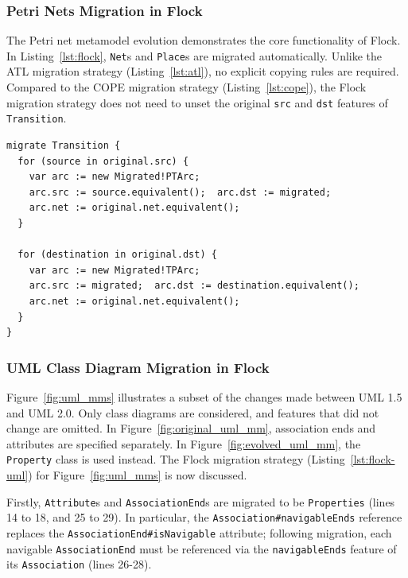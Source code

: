 \subsubsection{Petri Nets Migration in Flock}
The Petri net metamodel evolution demonstrates the core functionality of Flock. In Listing~\ref{lst:flock}, \texttt{Net}s and \texttt{Place}s are migrated automatically. Unlike the ATL migration strategy (Listing~\ref{lst:atl}), no explicit copying rules are required. Compared to the COPE migration strategy (Listing~\ref{lst:cope}), the Flock migration strategy does not need to unset the original \texttt{src} and \texttt{dst} features of \texttt{Transition}.

\begin{lstlisting}[caption=Petri nets model migration in Flock, label=lst:flock, language=Flock]
migrate Transition {
  for (source in original.src) {
    var arc := new Migrated!PTArc;
    arc.src := source.equivalent();  arc.dst := migrated;
    arc.net := original.net.equivalent();
  }

  for (destination in original.dst) {
    var arc := new Migrated!TPArc;
    arc.src := migrated;  arc.dst := destination.equivalent();
    arc.net := original.net.equivalent();
  }
}
\end{lstlisting}

\subsubsection{UML Class Diagram Migration in Flock}
Figure~\ref{fig:uml_mms} illustrates a subset of the changes made between UML 1.5 and UML 2.0. Only class diagrams are considered, and features that did not change are omitted. In Figure~\ref{fig:original_uml_mm}, association ends and attributes are specified separately. In Figure~\ref{fig:evolved_uml_mm}, the \texttt{Pr\-op\-er\-ty} class is used instead. The Flock migration strategy (Listing~\ref{lst:flock-uml}) for Figure~\ref{fig:uml_mms} is now discussed.

Firstly, \texttt{At\-tr\-ib\-ut\-e}s and \texttt{As\-so\-ci\-at\-i\-onEn\-d}s are migrated to be \texttt{Pr\-o\-pe\-rt\-ies} (lines 14 to 18, and 25 to 29). In particular, the \texttt{As\-so\-ci\-at\-i\-on\#na\-vi\-ga\-b\-leEn\-ds} reference replaces the \texttt{As\-so\-ci\-at\-i\-onE\-nd\#isN\-av\-ig\-ab\-le} attribute; following migration, each navigable \texttt{As\-so\-ci\-at\-i\-onE\-nd} must be referenced via the \texttt{na\-vi\-ga\-bl\-eEn\-ds} feature of its \texttt{As\-so\-ci\-at\-ion} (lines 26-28).

